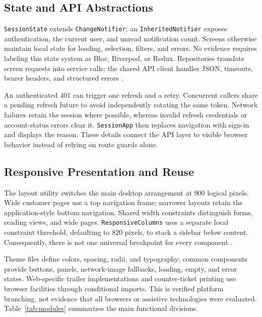 \documentclass[conference]{IEEEtran}
\newcommand{\code}[1]{\texttt{#1}}
\begin{document}
\subsection{State and API Abstractions}
\code{SessionState} extends \code{ChangeNotifier}; an
\code{InheritedNotifier} exposes authentication, the current user, and unread
notification count. Screens otherwise maintain local state for loading,
selection, filters, and errors. No evidence requires labeling this state system
as Bloc, Riverpod, or Redux. Repositories translate screen requests into
service calls; the shared API client handles JSON, timeouts, bearer headers,
and structured errors \cite{client}.

An authenticated 401 can trigger one refresh and a retry. Concurrent callers
share a pending refresh future to avoid independently rotating the same token.
Network failures retain the session where possible, whereas invalid refresh
credentials or account-status errors clear it. \code{SessionApp} then replaces
navigation with sign-in and displays the reason. These details connect the API
layer to visible browser behavior instead of relying on route guards alone.

\subsection{Responsive Presentation and Reuse}
The layout utility switches the main desktop arrangement at 900 logical pixels.
Wide customer pages use a top navigation frame; narrower layouts retain the
application-style bottom navigation. Shared width constraints distinguish forms,
reading views, and wide pages. \code{ResponsiveColumns} uses a separate local
constraint threshold, defaulting to 820 pixels, to stack a sidebar below content.
Consequently, there is not one universal breakpoint for every component
\cite{client,webui}.

Theme files define colors, spacing, radii, and typography; common components
provide buttons, panels, network-image fallbacks, loading, empty, and error
states. Web-specific trailer implementations and counter-ticket printing use
browser facilities through conditional imports. This is verified platform
branching, not evidence that all browsers or assistive technologies were
evaluated. Table~\ref{tab:modules} summarizes the main functional divisions.
\end{document}
